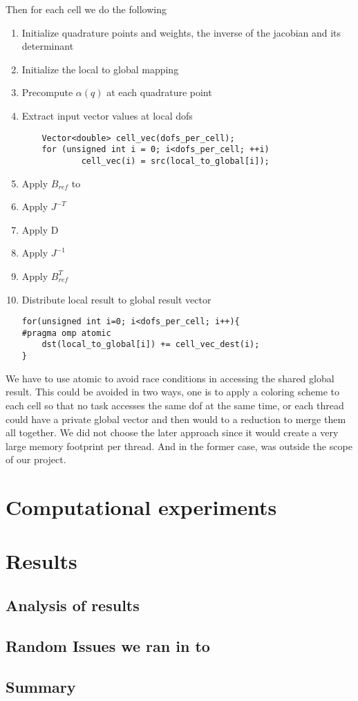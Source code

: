 \documentclass[12pt]{article}
\begin{document}
Then for each cell we do the following
\begin{enumerate}
\item Initialize quadrature points and weights, the inverse of the jacobian and its determinant
\item Initialize the local to global mapping
\item Precompute $\alpha(q)$ at each quadrature point
\item Extract input vector values at local dofs
\begin{lstlisting}
	Vector<double> cell_vec(dofs_per_cell);
	for (unsigned int i = 0; i<dofs_per_cell; ++i)
			cell_vec(i) = src(local_to_global[i]);
\end{lstlisting}
\item Apply $B_{ref}$ to 
\item Apply $J^{-T}$
\item Apply D
\item Apply $J^{-1}$
\item Apply $B^{T}_{ref}$
\item Distribute local result to global result vector
\begin{lstlisting}
for(unsigned int i=0; i<dofs_per_cell; i++){
#pragma omp atomic
	dst(local_to_global[i]) += cell_vec_dest(i);
}
\end{lstlisting}
\end{enumerate}
We have to use atomic to avoid race conditions in accessing the shared global result. This could be avoided in two ways, one is to apply a coloring scheme to each cell so that no task accesses the same dof at the same time, or each thread could have a private global vector and then would to a reduction to merge them all together. We did not choose the later approach since it would create a very large memory footprint per thread. And in the former case, was outside the scope of our project.


\section{Computational experiments}

\section{Results}

\subsection{Analysis of results}

\subsection{Random Issues we ran in to}

\subsection{Summary}




\end{document}
